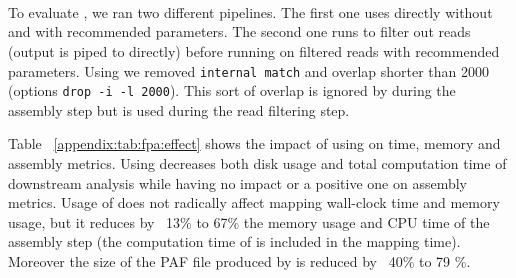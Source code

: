 \documentclass[./main.tex]{subfiles}
\begin{document}
\newpage
~


\newpage
\section{\fpa}\label{appendix:sec:fpa}

To evaluate \fpa, we ran two different pipelines. The first one uses directly \miniasm without \fpa and with recommended parameters. The second one runs \fpa to filter out reads (\minimap output is piped to \fpa directly) before running \miniasm on filtered reads with recommended parameters. Using \fpa we removed \texttt{internal match} and overlap shorter than 2000 (options \texttt{drop -i -l 2000}). This sort of overlap is ignored by \miniasm during the assembly step but is used during the read filtering step.

Table ~\ref{appendix:tab:fpa:effect} shows the impact of using \fpa on time, memory and assembly metrics.
Using \fpa decreases both disk usage and total computation time of downstream analysis while having no impact or a positive one on assembly metrics.
Usage of \fpa does not radically affect mapping wall-clock time and memory usage, but it reduces by ~13\% to 67\% the memory usage and CPU time of the assembly step (the computation time of \fpa is included in the mapping time). Moreover the size of the PAF file produced by \minimap is reduced by ~40\% to 79 \%.  
\end{document}
